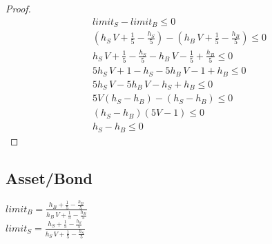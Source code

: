\documentclass[Bachelorarbeit.tex]{subfiles}
\begin{document}
\begin{proof}
\begin{align*}
	limit_S - limit_B \leq 0
	\\ (h_S \, V  + \frac{1}{5} - \frac{h_S}{5}) - ( h_B \, V  + \frac{1}{5} - \frac{h_B}{5} ) \leq 0
	\\ h_S \, V  + \frac{1}{5} - \frac{h_S}{5} -  h_B \, V  - \frac{1}{5} + \frac{h_B}{5} \leq 0
	\\ 5 h_S \, V  + 1 - h_S - 5h_B \, V  - 1 + h_B \leq 0
	\\ 5 h_S \, V - 5h_B \, V - h_S + h_B \leq 0
	\\ 5V(h_S - h_B) - (h_S - h_B) \leq 0	
	\\ (h_S - h_B)(5V - 1) \leq 0			\tag*{$|: (5V-1) \Rightarrow \geq 0 \; | \; V \; [0..1]$}
	\\ h_S - h_B \leq 0
\end{align*}
\end{proof}

\subsection{Asset/Bond}
$limit_B = \frac{h_B + \frac{1}{5} - \frac{h_B}{5}}{h_B \, V + \frac{1}{5} - \frac{h_B}{5}}$ \\
$limit_S = \frac{h_S + \frac{1}{5} - \frac{h_S}{5}}{h_S \, V + \frac{1}{5} - \frac{h_S}{5}}$ \\
\end{document}
